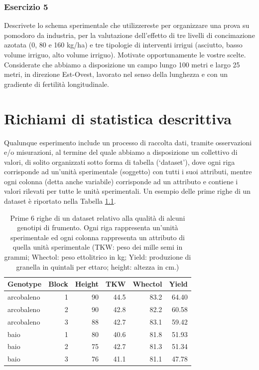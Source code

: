 \documentclass[
  12pt,
]{book}
\begin{document}
\hypertarget{esercizio-5}{%
\subsection{Esercizio 5}\label{esercizio-5}}

Descrivete lo schema sperimentale che utilizzereste per organizzare una prova su pomodoro da industria, per la valutazione dell'effetto di tre livelli di concimazione azotata (0, 80 e 160 kg/ha) e tre tipologie di interventi irrigui (asciutto, basso volume irriguo, alto volume irriguo). Motivate opportunamente le vostre scelte. Considerate che abbiamo a disposizione un campo lungo 100 metri e largo 25 metri, in direzione Est-Ovest, lavorato nel senso della lunghezza e con un gradiente di fertilità longitudinale.

\hypertarget{richiami-di-statistica-descrittiva}{%
\chapter{Richiami di statistica descrittiva}\label{richiami-di-statistica-descrittiva}}

Qualunque esperimento include un processo di raccolta dati, tramite osservazioni e/o misurazioni, al termine del quale abbiamo a disposizione un collettivo di valori, di solito organizzati sotto forma di tabella (`dataset'), dove ogni riga corrisponde ad un'unità sperimentale (soggetto) con tutti i suoi attributi, mentre ogni colonna (detta anche variabile) corrisponde ad un attributo e contiene i valori rilevati per tutte le unità sperimentali. Un esempio delle prime righe di un dataset è riportato nella Tabella \ref{tab:tabName1}.

\begin{table}

\caption{\label{tab:tabName1}Prime 6 righe di un dataset relativo alla qualità di alcuni genotipi di frumento. Ogni riga rappresenta un'unità sperimentale ed ogni colonna rappresenta un attributo di quella unità sperimentale (TKW: peso dei mille semi in grammi; Whectol: peso ettolitrico in kg; Yield: produzione di granella in quintali per ettaro; height: altezza in cm.)}
\centering
\begin{tabular}[t]{l|r|r|r|r|r}
\hline
Genotype & Block & Height & TKW & Whectol & Yield\\
\hline
arcobaleno & 1 & 90 & 44.5 & 83.2 & 64.40\\
\hline
arcobaleno & 2 & 90 & 42.8 & 82.2 & 60.58\\
\hline
arcobaleno & 3 & 88 & 42.7 & 83.1 & 59.42\\
\hline
baio & 1 & 80 & 40.6 & 81.8 & 51.93\\
\hline
baio & 2 & 75 & 42.7 & 81.3 & 51.34\\
\hline
baio & 3 & 76 & 41.1 & 81.1 & 47.78\\
\hline
\end{tabular}
\end{table}
\end{document}
